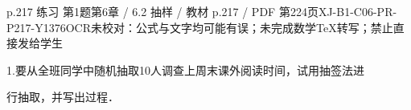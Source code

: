 \begin{bankitem}{p.217 练习 第1题}{第6章 / 6.2 抽样 / 教材 p.217 / PDF 第224页}{XJ-B1-C06-PR-P217-Y1376}{OCR未校对：公式与文字均可能有误；未完成数学TeX转写；禁止直接发给学生}
\begin{ocrdraft}
\par
1.要从全班同学中随机抽取10人调查上周末课外阅读时间，试用抽签法进
\par
行抽取，并写出过程．
\end{ocrdraft}
\end{bankitem}
